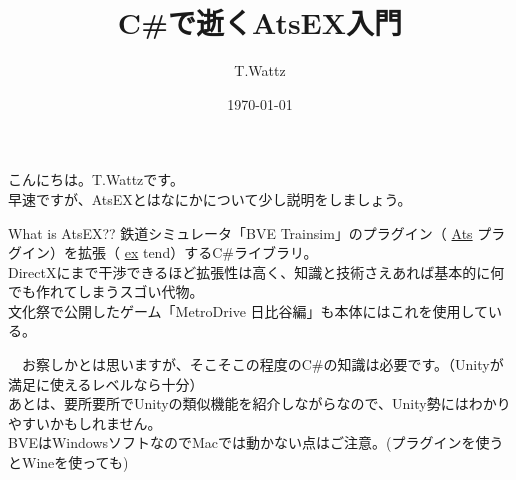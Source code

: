\documentclass[b5paper,9pt,platex,dvipdfmx]{jsarticle}
\begin{document}
\title{C\#で逝くAtsEX入門}
\author{T.Wattz}
\date{\today}
\maketitle
\thispagestyle{empty}

\begin{multicols*}{3}

こんにちは。T.Wattzです。\\
早速ですが、AtsEXとはなにかについて少し説明をしましょう。\\
\begin{itembox}[c]{What is AtsEX??}
鉄道シミュレータ「BVE Trainsim」のプラグイン（ \underline{Ats} プラグイン）を拡張（ \underline{ex} tend）するC\#ライブラリ。\\
DirectXにまで干渉できるほど拡張性は高く、知識と技術さえあれば基本的に何でも作れてしまうスゴい代物。\\
文化祭で公開したゲーム「MetroDrive 日比谷編」も本体にはこれを使用している。\\
\end{itembox}
　お察しかとは思いますが、そこそこの程度のC\#の知識は必要です。（Unityが満足に使えるレベルなら十分）\\
あとは、要所要所でUnityの類似機能を紹介しながらなので、Unity勢にはわかりやすいかもしれません。\\
BVEはWindowsソフトなのでMacでは動かない点はご注意。(プラグインを使うとWineを使っても)

\end{multicols*}
\end{document}
